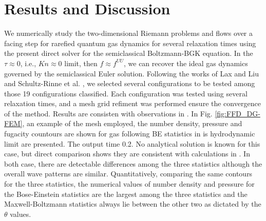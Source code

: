 \documentclass[twoside,twocolumn,prc,floats,amsmath,amssymb]{revtex4} %
\begin{document}
\section{Results and Discussion}

We numerically study the two-dimensional Riemann problems and flows over a facing step for rarefied quantum gas dynamics for several relaxation times using the present direct solver for the semiclassical Boltzmann-BGK equation.   In the $\tau \approx 0$, i.e.,  $Kn \approx 0$ limit, then $f \approx f^{UU}$, we can recover the ideal gas dynamics governed by the semiclassical Euler solution.  Following the works of Lax and Liu \cite{Laxliu1995} and Schultz-Rinne et al. \cite{Rinne1993}, we selected several configurations to be tested among those 19 configurations classified. Each configuration was tested using several relaxation times, and a mesh grid refiment was performed ensure the convergence of the method. Results are consisten with observations in \cite{Rinne1993, Laxliu1995}. In Fig. \ref{fig:FFD_DG-FEM}, an example of the mesh employed, the number density, pressure and fugacity countours are shown for gas following BE statistics in is hydrodynamic limit are presented. The output time 0.2. No analytical solution is known for this case, but direct comparison shows they are consistent with calculations in \cite{Cockburn1998,Woodward1984}. In both case, there are detectable differences among the three statistics although the overall wave patterns are similar. Quantitatively, comparing the same contours for the three statistics, the numerical values of number density and pressure for the Bose-Einstein statistics are the largest among the three statistics and the Maxwell-Boltzmann statistics always lie between the other two as dictated by the $\theta$ values.
\end{document}
